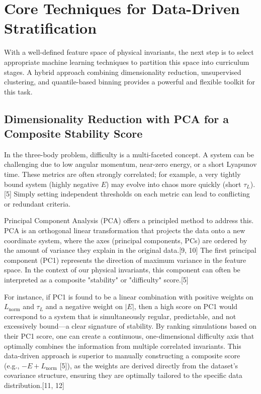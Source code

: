 \documentclass[11pt, letterpaper]{article}
\begin{document}
\section{Core Techniques for Data-Driven Stratification}

With a well-defined feature space of physical invariants, the next step is to select appropriate machine learning techniques to partition this space into curriculum stages. A hybrid approach combining dimensionality reduction, unsupervised clustering, and quantile-based binning provides a powerful and flexible toolkit for this task.

\subsection{Dimensionality Reduction with PCA for a Composite Stability Score}

In the three-body problem, difficulty is a multi-faceted concept. A system can be challenging due to low angular momentum, near-zero energy, or a short Lyapunov time. These metrics are often strongly correlated; for example, a very tightly bound system (highly negative $E$) may evolve into chaos more quickly (short $\tau_L$).[5] Simply setting independent thresholds on each metric can lead to conflicting or redundant criteria.

Principal Component Analysis (PCA) offers a principled method to address this. PCA is an orthogonal linear transformation that projects the data onto a new coordinate system, where the axes (principal components, PCs) are ordered by the amount of variance they explain in the original data.[9, 10] The first principal component (PC1) represents the direction of maximum variance in the feature space. In the context of our physical invariants, this component can often be interpreted as a composite "stability" or "difficulty" score.[5]

For instance, if PC1 is found to be a linear combination with positive weights on $L_{\text{norm}}$ and $\tau_L$ and a negative weight on $|E|$, then a high score on PC1 would correspond to a system that is simultaneously regular, predictable, and not excessively bound—a clear signature of stability. By ranking simulations based on their PC1 score, one can create a continuous, one-dimensional difficulty axis that optimally combines the information from multiple correlated invariants. This data-driven approach is superior to manually constructing a composite score (e.g., $-E + L_{\text{norm}}$ [5]), as the weights are derived directly from the dataset's covariance structure, ensuring they are optimally tailored to the specific data distribution.[11, 12]
\end{document}
